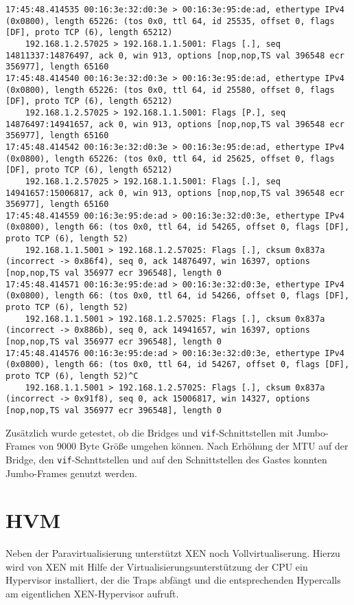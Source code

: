 \begin{verbatim}
17:45:48.414535 00:16:3e:32:d0:3e > 00:16:3e:95:de:ad, ethertype IPv4 (0x0800), length 65226: (tos 0x0, ttl 64, id 25535, offset 0, flags [DF], proto TCP (6), length 65212)
    192.168.1.2.57025 > 192.168.1.1.5001: Flags [.], seq 14811337:14876497, ack 0, win 913, options [nop,nop,TS val 396548 ecr 356977], length 65160
17:45:48.414540 00:16:3e:32:d0:3e > 00:16:3e:95:de:ad, ethertype IPv4 (0x0800), length 65226: (tos 0x0, ttl 64, id 25580, offset 0, flags [DF], proto TCP (6), length 65212)
    192.168.1.2.57025 > 192.168.1.1.5001: Flags [P.], seq 14876497:14941657, ack 0, win 913, options [nop,nop,TS val 396548 ecr 356977], length 65160
17:45:48.414542 00:16:3e:32:d0:3e > 00:16:3e:95:de:ad, ethertype IPv4 (0x0800), length 65226: (tos 0x0, ttl 64, id 25625, offset 0, flags [DF], proto TCP (6), length 65212)
    192.168.1.2.57025 > 192.168.1.1.5001: Flags [.], seq 14941657:15006817, ack 0, win 913, options [nop,nop,TS val 396548 ecr 356977], length 65160
17:45:48.414559 00:16:3e:95:de:ad > 00:16:3e:32:d0:3e, ethertype IPv4 (0x0800), length 66: (tos 0x0, ttl 64, id 54265, offset 0, flags [DF], proto TCP (6), length 52)
    192.168.1.1.5001 > 192.168.1.2.57025: Flags [.], cksum 0x837a (incorrect -> 0x86f4), seq 0, ack 14876497, win 16397, options [nop,nop,TS val 356977 ecr 396548], length 0
17:45:48.414571 00:16:3e:95:de:ad > 00:16:3e:32:d0:3e, ethertype IPv4 (0x0800), length 66: (tos 0x0, ttl 64, id 54266, offset 0, flags [DF], proto TCP (6), length 52)
    192.168.1.1.5001 > 192.168.1.2.57025: Flags [.], cksum 0x837a (incorrect -> 0x886b), seq 0, ack 14941657, win 16397, options [nop,nop,TS val 356977 ecr 396548], length 0
17:45:48.414576 00:16:3e:95:de:ad > 00:16:3e:32:d0:3e, ethertype IPv4 (0x0800), length 66: (tos 0x0, ttl 64, id 54267, offset 0, flags [DF], proto TCP (6), length 52)^C
    192.168.1.1.5001 > 192.168.1.2.57025: Flags [.], cksum 0x837a (incorrect -> 0x91f8), seq 0, ack 15006817, win 14327, options [nop,nop,TS val 356977 ecr 396548], length 0
\end{verbatim}
Zusätzlich wurde getestet, ob die Bridges und \verb#vif#-Schnittstellen mit Jumbo-Frames von 9000 Byte Größe umgehen können. Nach Erhöhung der MTU auf der Bridge, den \verb#vif#-Schnttstellen und auf den Schnittstellen des Gastes konnten Jumbo-Frames genutzt werden.

\section{HVM}
Neben der Paravirtualisierung unterstützt XEN noch Vollvirtualiserung. Hierzu wird von XEN mit Hilfe der Virtualisierungsunterstützung der CPU ein Hypervisor installiert, der die Traps abfängt und die entsprechenden Hypercalls am eigentlichen XEN-Hypervisor aufruft.

